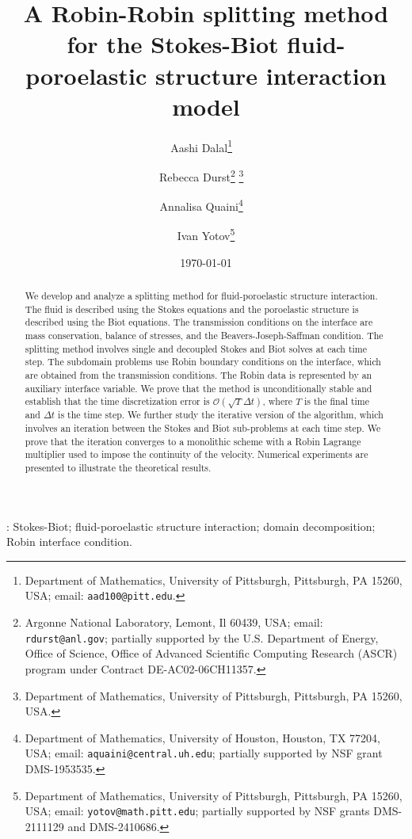 \documentclass[11pt]{article}
\begin{document}
\title{A Robin-Robin splitting method for the Stokes-Biot fluid-poroelastic structure interaction model}

\author{ Aashi Dalal\thanks{Department of Mathematics, University of Pittsburgh, Pittsburgh, PA 15260, USA; email: {\tt aad100@pitt.edu}.}
~\and
Rebecca Durst\thanks{Argonne National Laboratory, Lemont, Il 60439, USA; email: {\tt rdurst@anl.gov}; partially supported by the U.S. Department of Energy, Office of Science, Office of Advanced Scientific Computing Research (ASCR) program under Contract DE-AC02-06CH11357.}
\thanks{Department of Mathematics, University of Pittsburgh, Pittsburgh, PA 15260, USA.}
~\and
Annalisa Quaini\thanks{Department of Mathematics, University of Houston,
Houston, TX 77204, USA; email: {\tt aquaini@central.uh.edu};
partially supported by NSF grant {DMS-1953535}.}
  ~\and
  Ivan Yotov\thanks{Department of Mathematics,
    University of Pittsburgh, Pittsburgh, PA 15260, USA;
    email: {\tt yotov@math.pitt.edu}; partially supported by NSF grants DMS-2111129 and DMS-2410686.}}
\date{\today}
\maketitle
\begin{abstract}
\noindent 
We develop and analyze a splitting method for fluid-poroelastic structure interaction. The fluid is described using the Stokes equations and the poroelastic structure is described using the Biot equations. The transmission conditions on the interface are mass conservation, balance of stresses, and the Beavers-Joseph-Saffman condition. The splitting method involves single and decoupled Stokes and Biot solves at each time step. The subdomain problems use Robin boundary conditions on the interface, which are obtained from the transmission conditions. The Robin data is represented by an auxiliary interface variable. We prove that the method is unconditionally stable and establish that the time discretization error is {$\mathcal{O}(\sqrt{T}\Delta t)$}, where $T$ is the final time and $\Delta t$ is the time step. We further study the iterative version of the algorithm, which involves an iteration between the Stokes and Biot sub-problems at each time step. We prove that the iteration converges to a monolithic scheme with a Robin Lagrange multiplier used to impose the continuity of the velocity. Numerical experiments are presented to illustrate the theoretical results.
\end{abstract}
{}: Stokes-Biot; fluid-poroelastic structure interaction; domain decomposition;  Robin interface condition.
%	
\end{document}
